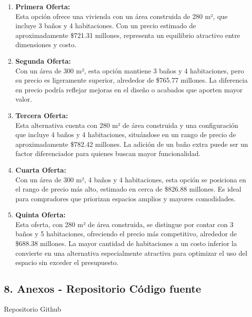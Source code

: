 \documentclass[
]{article}
\begin{document}
\begin{enumerate}
\def\labelenumi{\arabic{enumi}.}
\item
  \textbf{Primera Oferta:}\\
  Esta opción ofrece una vivienda con un área construida de 280 m², que
  incluye 3 baños y 4 habitaciones. Con un precio estimado de
  aproximadamente \$721.31 millones, representa un equilibrio atractivo
  entre dimensiones y costo.
\item
  \textbf{Segunda Oferta:}\\
  Con un área de 300 m², esta opción mantiene 3 baños y 4 habitaciones,
  pero su precio es ligeramente superior, alrededor de \$765.77
  millones. La diferencia en precio podría reflejar mejoras en el diseño
  o acabados que aporten mayor valor.
\item
  \textbf{Tercera Oferta:}\\
  Esta alternativa cuenta con 280 m² de área construida y una
  configuración que incluye 4 baños y 4 habitaciones, situándose en un
  rango de precio de aproximadamente \$782.42 millones. La adición de un
  baño extra puede ser un factor diferenciador para quienes buscan mayor
  funcionalidad.
\item
  \textbf{Cuarta Oferta:}\\
  Con un área de 300 m², 4 baños y 4 habitaciones, esta opción se
  posiciona en el rango de precio más alto, estimado en cerca de
  \$826.88 millones. Es ideal para compradores que priorizan espacios
  amplios y mayores comodidades.
\item
  \textbf{Quinta Oferta:}\\
  Esta oferta, con 280 m² de área construida, se distingue por contar
  con 3 baños y 5 habitaciones, ofreciendo el precio más competitivo,
  alrededor de \$688.38 millones. La mayor cantidad de habitaciones a un
  costo inferior la convierte en una alternativa especialmente atractiva
  para optimizar el uso del espacio sin exceder el presupuesto.
\end{enumerate}

\subsection{\texorpdfstring{\textbf{8. Anexos - Repositorio Código
fuente}}{8. Anexos - Repositorio Código fuente}}\label{anexos---repositorio-cuxf3digo-fuente}

Repositorio Github
\end{document}
